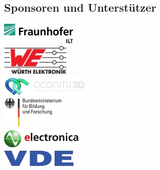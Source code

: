\documentclass[a4paper,12pt,notumble]{leaflet}
\begin{document}
\begin{center}
\section{Sponsoren und Unterstützer}
\includegraphics[height= 1cm]{../Logos/ILT.png} \\ \vspace{0.3cm}
\includegraphics[height= 1.5cm]{../Logos/Wuerth.png} \\ \vspace{0.3cm}
\includegraphics[height= 1cm]{../Logos/aconity.png} \\ \vspace{0.3cm}
\includegraphics[height= 1.5cm]{../Logos/BMBF.jpg} \\ \vspace{0.3cm}
\includegraphics[height= 1cm]{../Logos/electronica.png} \\ \vspace{0.3cm}
\includegraphics[height= 0.8cm]{../Logos/VDE.jpg}
\end{center}
\end{document}
